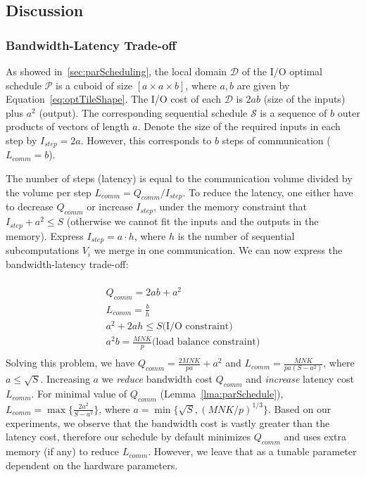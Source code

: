 \documentclass[sigplan,review,anonymous]{acmart}\settopmatter{printfolios=true,printccs=false,printacmref=false}
\begin{document}
\subsection{Discussion}

\subsubsection{Bandwidth-Latency Trade-off}
As showed in~\cref{sec:parScheduling}, the local domain $\mathcal{D}$ of the 
I/O optimal 
schedule $\mathcal{P}$ is a cuboid of size $[a \times a \times b]$, where $a, 
b$ are given by Equation~\ref{eq:optTileShape}. The I/O cost of each  
$\mathcal{D}$ is $2ab$ (size of the inputs) plus $a^2$ (output). 
 The corresponding sequential 
schedule $\mathcal{S}$ is a sequence of $b$ outer products of vectors of length 
$a$. Denote the size of the required inputs in each step by $I_{step} = 2a$. 
However, this corresponds to $b$ steps of communication ($L_{comm} = b$).

The number of steps (latency) is equal to the communication volume divided by 
the volume per step $L_{comm} = Q_{comm}/I_{step}$. To reduce the latency, one 
either have to decrease $Q_{comm}$ or increase $I_{step}$, under the memory 
constraint that $I_{step} + a^2 \le S$ (otherwise we cannot fit the inputs and 
the outputs in the memory). Express $I_{step} = a \cdot h$, where $h$ is the 
number of sequential subcomputations $V_i$ we merge in one communication. We 
can now express the bandwidth-latency trade-off:

\begin{multline}
\\
Q_{comm} = 2ab + a^2 \\
L_{comm} = \frac{b}{h} \\
a^2 + 2ah \le S \text{(I/O constraint)} \\
a^2b = \frac{MNK}{p} \text{(load balance constraint)} \\
\end{multline}
Solving this problem, we have $Q_{comm} = \frac{2MNK}{pa} + a^2$ and $L_{comm} 
= 
\frac{MNK}{pa(S-a^2)}$, 
where $a \le \sqrt{S}$. Increasing $a$ we \emph{reduce} bandwidth cost 
$Q_{comm}$ and \emph{increase} latency cost $L_{comm}$. For minimal value of 
$Q_{comm}$ (Lemma~\ref{lma:parSchedule}),  $L_{comm} = \max\{\frac{2a^2}{S - 
a^2}\}$, where $a = \min\{\sqrt{S}, (MNK/p)^{1/3} \}$. Based on our 
experiments, we observe that the bandwidth cost is vastly greater than the 
latency cost, therefore our schedule by default minimizes $Q_{comm}$ and uses 
extra memory (if any) to reduce $L_{comm}$. However, we leave that as a tunable 
parameter dependent on the hardware parameters.
\end{document}
